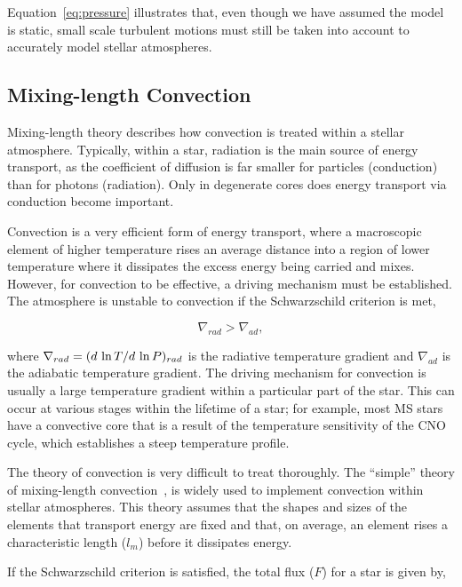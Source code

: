 Equation~\ref{eq:pressure} illustrates that, even though we have assumed the model is static, small scale turbulent motions must still be taken into account to accurately model stellar atmospheres.



\subsection{Mixing-length Convection} %
\label{sub:mlt}

Mixing-length theory describes how convection is treated within a stellar atmosphere.
Typically, within a star, radiation is the main source of energy transport, as the coefficient of diffusion is far smaller for particles (conduction) than for photons (radiation).
Only in degenerate cores does energy transport via conduction become important.

Convection is a very efficient form of energy transport, where a macroscopic element of higher temperature rises an average distance into a region of lower temperature where it dissipates the excess energy being carried and mixes.
However, for convection to be effective, a driving mechanism must be established.
The atmosphere is unstable to convection if the Schwarzschild criterion is met,

\begin{equation}
    \nabla_{rad} > \nabla_{ad},
\end{equation}

where $\nabla_{rad} = (d~{\rm ln}\,T/d~{\rm ln}\,P)_{rad}$ is the radiative temperature gradient and $\nabla_{ad}$ is the adiabatic temperature gradient.
The driving mechanism for convection is usually a large temperature gradient within a particular part of the star.
This can occur at various stages within the lifetime of a star; for example, most MS stars have a convective core that is a result of the temperature sensitivity of the CNO cycle, which establishes a steep temperature profile.

The theory of convection is very difficult to treat thoroughly.
The ``simple'' theory of mixing-length convection~,\citep{1958ZA.....46..108B,1965ApJ...142..841H} is widely used to implement convection within stellar atmospheres.
This theory assumes that the shapes and sizes of the elements that transport energy are fixed and that, on average, an element rises a characteristic length ($l_m$) before it dissipates energy.

If the Schwarzschild criterion is satisfied, the total flux ($F$) for a star is given by,

